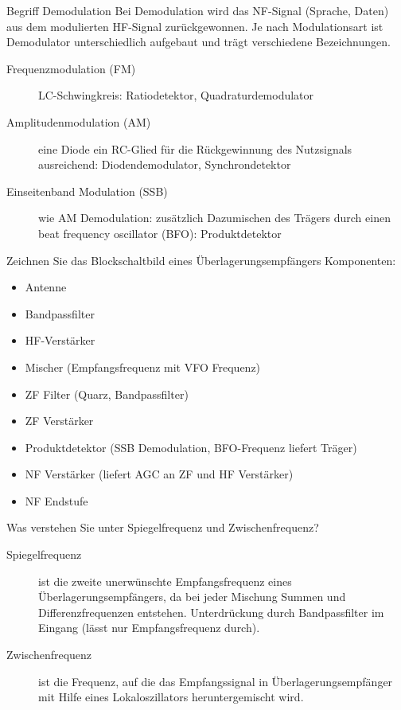 \documentclass[avery5371,grid,frame,a4paper]{flashcards}
\newcommand{\card}[3]{
  \begin{flashcard}[{\chap} -- #1]{#2}#3\end{flashcard}
}
\begin{document}
\card{36}{Begriff Demodulation}{
  \footnotesize
  Bei Demodulation wird das NF-Signal (Sprache, Daten) aus dem modulierten HF-Signal zurückgewonnen.
  Je nach Modulationsart ist Demodulator unterschiedlich aufgebaut und trägt verschiedene Bezeichnungen.

  \begin{description}
    \item[Frequenzmodulation (FM)]
      LC-Schwingkreis:
      Ratiodetektor, Quadraturdemodulator
    \item[Amplitudenmodulation (AM)]
      eine Diode ein RC-Glied für die Rückgewinnung des Nutzsignals ausreichend:
      Diodendemodulator, Synchrondetektor
    \item[Einseitenband Modulation (SSB)]
      wie AM Demodulation: zusätzlich Dazumischen des Trägers durch einen beat frequency oscillator (BFO):
      Produktdetektor
  \end{description}
}
\card{37}{Zeichnen Sie das Blockschaltbild eines Überlagerungsempfängers}{
  \footnotesize
  Komponenten:
  \begin{itemize}\itemsep0pt
    \item Antenne
    \item Bandpassfilter
    \item HF-Verstärker
    \item Mischer (Empfangsfrequenz mit VFO Frequenz)
    \item ZF Filter (Quarz, Bandpassfilter)
    \item ZF Verstärker
    \item Produktdetektor (SSB Demodulation, BFO-Frequenz liefert Träger)
    \item NF Verstärker (liefert AGC an ZF und HF Verstärker)
    \item NF Endstufe
  \end{itemize}
}
\card{38}{Was verstehen Sie unter Spiegelfrequenz und Zwischenfrequenz?}{
  \begin{description}
    \item[Spiegelfrequenz]
      ist die zweite unerwünschte Empfangsfrequenz eines Überlagerungsempfängers,
      da bei jeder Mischung Summen und Differenzfrequenzen entstehen.
      Unterdrückung durch Bandpassfilter im Eingang (lässt nur Empfangsfrequenz durch).
    \item[Zwischenfrequenz]
      ist die Frequenz,
      auf die das Empfangssignal in Überlagerungsempfänger mit Hilfe eines Lokaloszillators heruntergemischt wird.
  \end{description}
}
\end{document}
